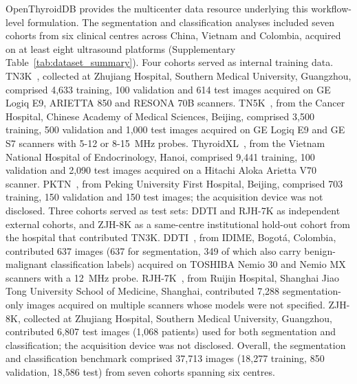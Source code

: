 \documentclass[fleqn,10pt]{wlscirep}
\begin{document}
OpenThyroidDB provides the multicenter data resource underlying this workflow-level formulation. The segmentation and classification analyses included seven cohorts from six clinical centres across China, Vietnam and Colombia, acquired on at least eight ultrasound platforms (Supplementary Table~\ref{tab:dataset_summary}). Four cohorts served as internal training data. TN3K~\cite{gong2021multi}, collected at Zhujiang Hospital, Southern Medical University, Guangzhou, comprised 4,633 training, 100 validation and 614 test images acquired on GE Logiq E9, ARIETTA 850 and RESONA 70B scanners. TN5K~\cite{zhang2025tn5000}, from the Cancer Hospital, Chinese Academy of Medical Sciences, Beijing, comprised 3,500 training, 500 validation and 1,000 test images acquired on GE Logiq E9 and GE S7 scanners with 5-12 or 8-15~MHz probes. ThyroidXL~\cite{duong2025thyroidxl}, from the Vietnam National Hospital of Endocrinology, Hanoi, comprised 9,441 training, 100 validation and 2,090 test images acquired on a Hitachi Aloka Arietta V70 scanner. PKTN~\cite{sun2025clip}, from Peking University First Hospital, Beijing, comprised 703 training, 150 validation and 150 test images; the acquisition device was not disclosed. Three cohorts served as test sets: DDTI and RJH-7K as independent external cohorts, and ZJH-8K as a same-centre institutional hold-out cohort from the hospital that contributed TN3K. DDTI~\cite{pedraza2015open}, from IDIME, Bogot\'{a}, Colombia, contributed 637 images (637 for segmentation, 349 of which also carry benign-malignant classification labels) acquired on TOSHIBA Nemio 30 and Nemio MX scanners with a 12~MHz probe. RJH-7K~\cite{shusharina2021segmentation}, from Ruijin Hospital, Shanghai Jiao Tong University School of Medicine, Shanghai, contributed 7,288 segmentation-only images acquired on multiple scanners whose models were not specified. ZJH-8K, collected at Zhujiang Hospital, Southern Medical University, Guangzhou, contributed 6,807 test images (1,068 patients) used for both segmentation and classification; the acquisition device was not disclosed. Overall, the segmentation and classification benchmark comprised 37{,}713 images (18{,}277 training, 850 validation, 18{,}586 test) from seven cohorts spanning six centres.
\end{document}
